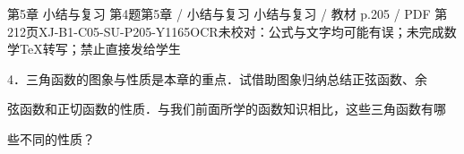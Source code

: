 \begin{bankitem}{第5章 小结与复习 第4题}{第5章 / 小结与复习 小结与复习 / 教材 p.205 / PDF 第212页}{XJ-B1-C05-SU-P205-Y1165}{OCR未校对：公式与文字均可能有误；未完成数学TeX转写；禁止直接发给学生}
\begin{ocrdraft}
\par
4．三角函数的图象与性质是本章的重点．试借助图象归纳总结正弦函数、余
\par
弦函数和正切函数的性质．与我们前面所学的函数知识相比，这些三角函数有哪
\par
些不同的性质？
\end{ocrdraft}
\end{bankitem}
